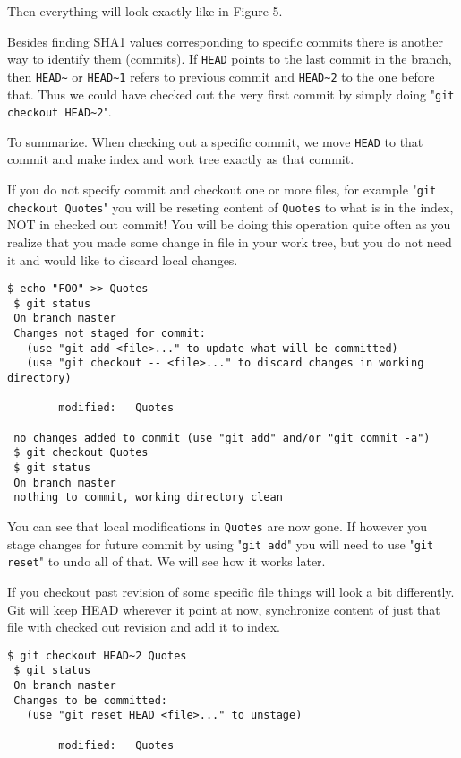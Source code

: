 \documentclass{article}
\theoremstyle{definition}
\begin{document}
        \noindent Then everything will look exactly like in Figure 5.

        Besides finding SHA1 values corresponding to specific commits there is another way to identify them (commits).
        If \texttt{HEAD} points to the last commit in the branch, then \texttt{HEAD\textasciitilde}
        or \texttt{HEAD\textasciitilde1} refers to previous commit and \texttt{HEAD\textasciitilde2} to the one before
        that. Thus we could have checked out the very first commit by simply
        doing "\texttt{git checkout HEAD\textasciitilde2}".

        To summarize. When checking out a specific commit, we move \texttt{HEAD} to that commit and make index and work
        tree exactly as that commit.

        If you do not specify commit and checkout one or more files, for example "\texttt{git checkout Quotes}" you
        will be reseting content of \texttt{Quotes} to what is in the index, NOT in checked out commit! You will be
        doing this operation quite often as you realize that you made some change in file in your work tree, but you do
        not need it and would like to discard local changes.

        \begin{Verbatim}[frame=single]
 $ echo "FOO" >> Quotes
 $ git status
 On branch master
 Changes not staged for commit:
   (use "git add <file>..." to update what will be committed)
   (use "git checkout -- <file>..." to discard changes in working directory)

        modified:   Quotes

 no changes added to commit (use "git add" and/or "git commit -a")
 $ git checkout Quotes
 $ git status
 On branch master
 nothing to commit, working directory clean
        \end{Verbatim}
        You can see that local modifications in \texttt{Quotes} are now gone. If however you stage changes for future
        commit by using "\texttt{git add}" you will need to use "\texttt{git reset}" to undo all of that. We will see
        how it works later.

        If you checkout past revision of some specific file things will look a bit differently. Git will keep HEAD
        wherever it point at now, synchronize content of just that file with checked out revision and add it to index.

        \begin{Verbatim}[frame=single]
 $ git checkout HEAD~2 Quotes
 $ git status
 On branch master
 Changes to be committed:
   (use "git reset HEAD <file>..." to unstage)

        modified:   Quotes
        \end{Verbatim}
\end{document}
